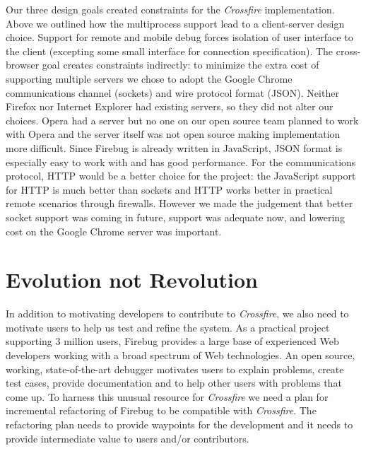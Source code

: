 Our three design goals created constraints for the \textit{Crossfire} implementation. 
Above we outlined
how the multiprocess support lead to a client-server design choice. Support for
remote and mobile debug forces isolation of user interface to the client
(excepting some small interface for connection specification). The cross-browser
goal creates constraints indirectly: to minimize the extra cost of supporting
multiple servers we chose to adopt the Google Chrome communications channel
(sockets) and wire protocol format (JSON). Neither Firefox nor Internet Explorer
had existing servers, so they did not alter our choices. Opera had a server but
no one on our open source team planned to work with Opera and the server itself
was not open source making implementation more difficult.  Since Firebug is
already written in JavaScript, JSON format is especially easy to work with and
has good performance\cite{JSON}.  For the communications protocol, HTTP would be
a better choice for the project: the JavaScript support for HTTP is much better
than sockets and HTTP works better in practical remote scenarios through
firewalls.  However we made the judgement that better socket support was coming
in future\cite{WebSockets}, support was adequate now, and lowering cost on the
Google Chrome server was important.

\section{Evolution not Revolution}
In addition to motivating developers to contribute to \textit{Crossfire}, we also need to motivate users
to help us test and refine the system.   
As a practical project supporting 3 million users, Firebug 
provides a large base of experienced Web developers working with a broad spectrum of Web technologies.
An open source, working, state-of-the-art debugger motivates users to explain problems, create test cases, 
provide documentation and to help other users with problems that come up. To harness this 
 unusual resource  for \textit{Crossfire} we need a plan for incremental refactoring of Firebug to be compatible
with \textit{Crossfire}.  The refactoring plan needs to provide waypoints for the development and it needs to
provide intermediate value to users and/or contributors.

